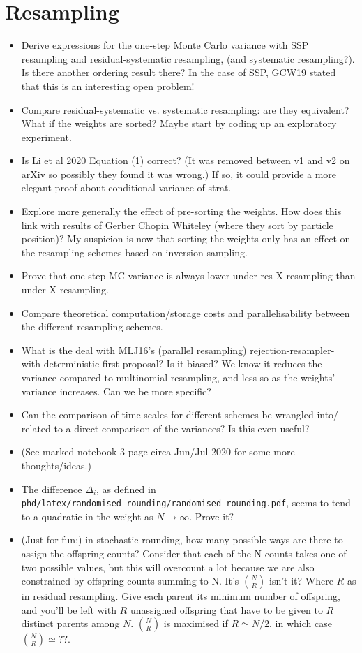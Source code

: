 \documentclass{article}
\begin{document}
\section*{Resampling}
\begin{itemize}
\item Derive expressions for the one-step Monte Carlo variance with SSP resampling and residual-systematic resampling, (and systematic resampling?). Is there another ordering result there? In the case of SSP, GCW19 stated that this is an interesting open problem!
\item Compare residual-systematic vs. systematic resampling: are they equivalent? What if the weights are sorted? Maybe start by coding up an exploratory experiment.
\item Is Li et al 2020 Equation (1) correct? (It was removed between v1 and v2 on arXiv so possibly they found it was wrong.) If so, it could provide a more elegant proof about conditional variance of strat.
\item Explore more generally the effect of pre-sorting the weights. How does this link with results of Gerber Chopin Whiteley (where they sort by particle position)? My suspicion is now that sorting the weights only has an effect on the resampling schemes based on inversion-sampling.
\item Prove that one-step MC variance is always lower under res-X resampling than under X resampling.
\item Compare theoretical computation/storage costs and parallelisability between the different resampling schemes.
\item What is the deal with MLJ16's (parallel resampling) rejection-resampler-with-deterministic-first-proposal? Is it biased? We know it reduces the variance compared to multinomial resampling, and less so as the weights' variance increases. Can we be more specific?
\item Can the comparison of time-scales for different schemes be wrangled into/ related to a direct comparison of the variances? Is this even useful?
\item (See marked notebook 3 page circa Jun/Jul 2020 for some more thoughts/ideas.)
\item The difference $\Delta_i$, as defined in \texttt{phd/latex/randomised\_rounding/randomised\_rounding.pdf}, seems to tend to a quadratic in the weight as $N\to\infty$. Prove it?
\item (Just for fun:) in stochastic rounding, how many possible ways are there to assign the offspring counts? Consider that each of the N counts takes one of two possible values, but this will overcount a lot because we are also constrained by offspring counts summing to N. It's $\binom{N}{R}$ isn't it? Where $R$ as in residual resampling. Give each parent its minimum number of offspring, and you'll be left with $R$ unassigned offspring that have to be given to $R$ distinct parents among $N$. $\binom{N}{R}$ is maximised if $R\simeq N/2$, in which case $\binom{N}{R}\simeq ??$.

\end{itemize}
\end{document}
